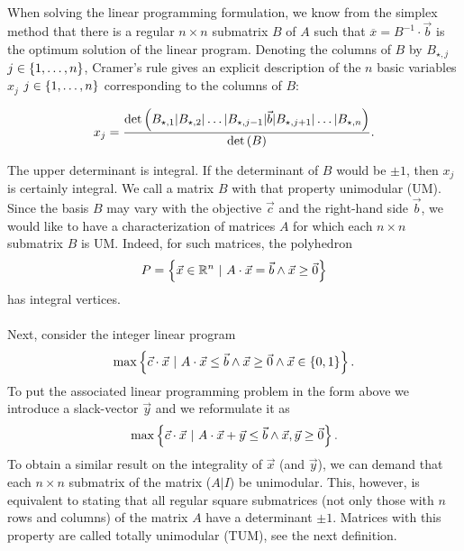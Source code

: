 \documentclass[titlepage]{book}
\theoremstyle{plain}
\theoremstyle{definition}
\theoremstyle{remark}
\begin{document}
\paragraph{}
When solving the linear programming formulation, we know from the simplex method that there is a regular $n\times n$ submatrix $B$ of $A$ such that $\overline{x}=B^{-1}\cdot\vec{b}$ is the optimum solution of the linear program. Denoting the columns of $B$ by $B_{\star,j}$ $j\in\left\{ 1,\ldots,n \right\}$, Cramer's rule gives an explicit description of the $n$ basic variables $x_j$ $j\in\left\{ 1,\ldots,n \right\}$ corresponding to the columns of $B$:

\begin{equation}
x_j=\displaystyle\frac{\mbox{det}\left( B_{\star,1}|B_{\star,2}|\ldots|B_{\star,j-1}|\vec{b}|B_{\star,j+1}|\ldots|B_{\star,n} \right)}{\mbox{det}\left( B \right)}.
\end{equation}

The upper determinant is integral. If the determinant of $B$ would be $\pm 1$, then $x_j$ is certainly integral. We call a matrix $B$ with that property unimodular (UM). Since the basis $B$ may vary with the objective $\vec{c}$ and the right-hand side $\vec{b}$, we would like to have a characterization of matrices $A$ for which each $n\times n$ submatrix $B$ is UM. Indeed, for such matrices, the polyhedron
\begin{equation}
P=\left\{ \vec{x}\in\mathbb{R}^n\ |\ A\cdot\vec{x}=\vec{b}\wedge\vec{x}\geq\vec{0} \right\}
\end{equation}
has integral vertices.

\paragraph{}
Next, consider the integer linear program
\begin{equation}
\max\left\{ \vec{c}\cdot\vec{x}\ |\ A\cdot\vec{x}\leq\vec{b}\wedge\vec{x}\geq\vec{0}\wedge\vec{x}\in\left\{ 0,1 \right\} \right\}.
\end{equation}
To put the associated linear programming problem in the form above we introduce a slack-vector $\vec{y}$ and we reformulate it as
\begin{equation}
\max\left\{ \vec{c}\cdot\vec{x}\ |\ A\cdot\vec{x}+\vec{y}\leq\vec{b}\wedge\vec{x},\vec{y}\geq\vec{0} \right\}.
\end{equation}
To obtain a similar result on the integrality of $\vec{x}$ (and $\vec{y}$), we can demand that each $n\times n$ submatrix of the matrix ($A|I$) be unimodular. This, however, is equivalent to stating that all regular square submatrices (not only those with $n$ rows and columns) of the matrix $A$ have a determinant $\pm 1$. Matrices with this property are called totally unimodular (TUM), see the next definition.
\end{document}
